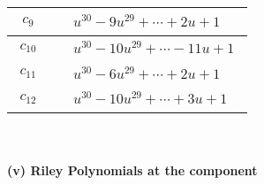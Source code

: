 \documentclass[1p]{elsarticle_modified}
\theoremstyle{definition}
\begin{document}
\begin{tabular}{m{50pt}|m{274pt}}
\hline $$\begin{aligned}c_{9}\end{aligned}$$&$\begin{aligned}
&u^{30}-9 u^{29}+\cdots+2 u+1
\end{aligned}$\\
\hline $$\begin{aligned}c_{10}\end{aligned}$$&$\begin{aligned}
&u^{30}-10 u^{29}+\cdots-11 u+1
\end{aligned}$\\
\hline $$\begin{aligned}c_{11}\end{aligned}$$&$\begin{aligned}
&u^{30}-6 u^{29}+\cdots+2 u+1
\end{aligned}$\\
\hline $$\begin{aligned}c_{12}\end{aligned}$$&$\begin{aligned}
&u^{30}-10 u^{29}+\cdots+3 u+1
\end{aligned}$\\
\hline
\end{tabular}\\~\\
\newpage\renewcommand{\arraystretch}{1}
\flushleft \textbf{(v) Riley Polynomials at the component}\newline \\
\end{document}
